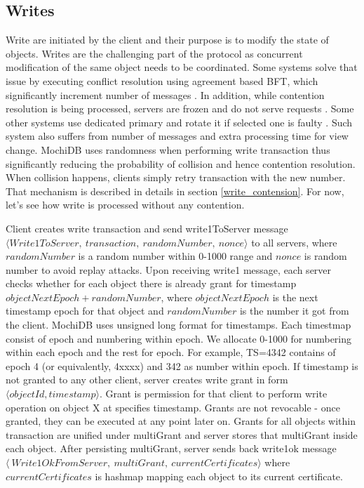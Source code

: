 \documentclass[letterpaper,twocolumn,10pt]{article}
\begin{document}
\subsection{Writes} \label{Protocol_Writes}
Write are initiated by the client and their purpose is to modify the state of objects. Writes are the challenging part of the protocol as concurrent modification of the same object needs to be coordinated. Some systems solve that issue by executing conflict resolution using agreement based BFT, which significantly increment number of messages \cite{HQ_replication}. In addition, while contention resolution is being processed, servers are frozen and do not serve requests \cite{HQ_replication}. Some other systems use dedicated primary and rotate it if selected one is faulty \cite{Practical_BFT}. Such system also suffers from number of messages and extra processing time for view change.
MochiDB uses randomness when performing write transaction thus significantly reducing the probability of collision and hence contention resolution. When collision happens, clients simply retry transaction with the new number. That mechanism is described in details in section \ref{write_contension}. For now, let's see how write is processed without any contention.

Client creates write transaction and send write1ToServer message $\langle Write1ToServer,\ transaction,\ randomNumber,\ nonce \rangle$ to all servers, where $randomNumber$ is a random number within 0-1000 range and $nonce$ is random number to avoid replay attacks. Upon receiving write1 message, each server checks whether for each object there is already grant for timestamp $objectNextEpoch + randomNumber$, where $objectNextEpoch$ is the next timestamp epoch for that object and $randomNumber$ is the number it got from the client. MochiDB uses unsigned long format for timestamps. Each timestmap consist of epoch and numbering within epoch. We allocate 0-1000 for numbering within each epoch and the rest for epoch. For example, TS=4342 contains of epoch 4 (or equivalently, 4xxxx) and 342 as number within epoch. If timestamp is not granted to any other client, server creates write grant in form $\langle objectId, timestamp \rangle$. Grant is permission for that client to perform write operation on object X at specifies timestamp. Grants are not revocable - once granted, they can be executed at any point later on. Grants for all objects within transaction are unified under multiGrant and server stores that multiGrant inside each object. After persisting multiGrant, server sends back write1ok message $\langle\ Write1OkFromServer,\ multiGrant,\ currentCertificates \rangle$ where $currentCertificates$ is hashmap mapping each object to its current certificate.
\end{document}
